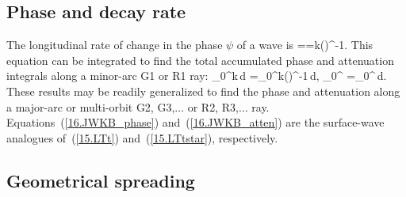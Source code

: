 \subsection{Phase and decay rate}
%
%
%
%
%

The longitudinal rate of change in the phase $\psi$ of a wave is
\eq
{}==k\sin\theta(\cos\zeta)^{-1}.
\en
This equation can be integrated to find the total
accumulated phase and attenuation integrals along
a minor-arc G1 or R1 ray:
\eq \label{16.JWKB_phase}
\int_0^{\Delta}k\,d\Delta
=\int_0^\Theta k\sin\theta(\cos\zeta)^{-1}\,d\phi,
\en
\eq \label{16.JWKB_atten}
\int_0^{\Delta}
=\int_0^\Theta{}\,d\phi.
\en
These results may be readily generalized to find
the phase and attenuation along a major-arc
or multi-orbit G2, G3,\hspace{0.2mm}$\ldots$ or R2, R3,\hspace{0.2mm}$\ldots$
ray.  Equations~(\ref{16.JWKB_phase}) and~(\ref{16.JWKB_atten})
are the surface-wave analogues of~(\ref{15.LTt}) and~(\ref{15.LTtstar}),
respectively.
%
%
%
%
%

\subsection{Geometrical spreading}
%


